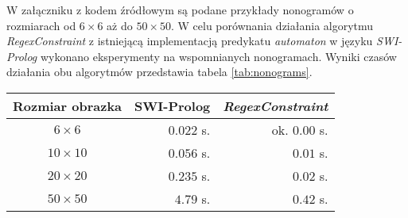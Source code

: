 \par
W załączniku z kodem źródłowym są podane przykłady nonogramów o rozmiarach od $6 \times 6$ aż do $50 \times 50$.
W celu porównania działania algorytmu \textit{RegexConstraint} z istniejącą implementacją predykatu \textit{automaton}
w języku \textit{SWI-Prolog} wykonano eksperymenty na wspomnianych nonogramach. Wyniki czasów działania obu algorytmów
przedstawia tabela \ref{tab:nonograms}.
\begin{center}
  \begin{tabular}{|c|r|r|}
  \hline
    {\bf Rozmiar obrazka} &
    {\bf SWI-Prolog} &
    {\bf \textit{RegexConstraint}} \\
  \hline
  \hline
  $6 \times 6$ & $0.022$ s. & ok. $0.00$ s. \\
  \hline
  $10 \times 10$ & $0.056$ s. & $0.01$ s. \\
  \hline
  $20 \times 20$ & $0.235$ s. & $0.02$ s. \\
  \hline
  $50 \times 50$ & $4.79$ s. & $0.42$ s. \\
  \hline
  \end{tabular}
  \label{tab:nonograms}
\end{center}

